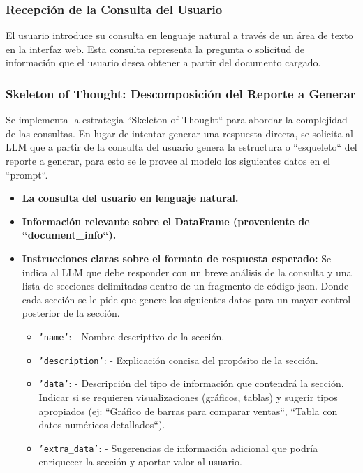 \subsubsection{Recepción de la Consulta del Usuario}

El usuario introduce su consulta en lenguaje natural a través de un área de texto en la interfaz web. Esta consulta representa la pregunta o solicitud de información que el usuario desea obtener a partir del documento cargado.

\subsubsection{Skeleton of Thought: Descomposición del Reporte a Generar}

Se implementa la estrategia ``Skeleton of Thought`` para abordar la complejidad de las consultas.  En lugar de intentar generar una respuesta directa,  se solicita al LLM que a partir de la consulta del usuario genera la estructura o ``esqueleto`` del reporte a generar, para esto se le provee al modelo los siguientes datos en el ``prompt``.

\begin{itemize}
	\item \textbf{La consulta del usuario en lenguaje natural.}
	\item \textbf{Información relevante sobre el DataFrame (proveniente de ``document\_info``).}
	\item \textbf{Instrucciones claras sobre el formato de respuesta esperado:}  Se indica al LLM que debe responder con un breve análisis de la consulta y una lista de secciones delimitadas dentro de un fragmento de código json. Donde cada sección se le pide que genere los siguientes datos para un mayor control posterior de la sección. 
	\begin{itemize}
		\item \texttt{'name'}: - Nombre descriptivo de la sección.
		\item \texttt{'description'}: -  Explicación concisa del propósito de la sección.
		\item \texttt{'data'}: - Descripción del tipo de información que contendrá la sección.  Indicar si se requieren visualizaciones (gráficos, tablas) y sugerir tipos apropiados (ej: ``Gráfico de barras para comparar ventas``, ``Tabla con datos numéricos detallados``).
		\item \texttt{'extra\_data'}: -  Sugerencias de información adicional que podría enriquecer la sección y aportar valor al usuario.
	\end{itemize}
\end{itemize}

